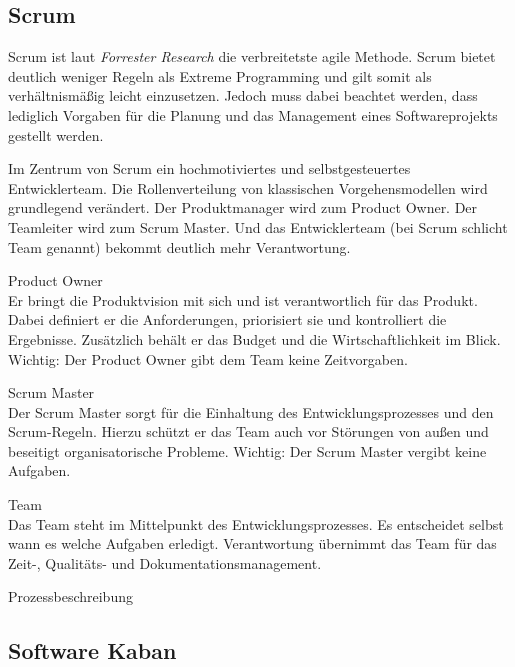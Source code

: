 \subsection{Scrum} \label{ch:scrum}
Scrum ist laut \emph{Forrester Research} die verbreitetste agile Methode. \cite{bib:ane} Scrum bietet deutlich weniger Regeln als Extreme Programming und gilt somit als verhältnismäßig leicht einzusetzen. Jedoch muss dabei beachtet werden, dass lediglich Vorgaben für die Planung und das Management eines Softwareprojekts gestellt werden. 

Im Zentrum von Scrum ein hochmotiviertes und selbstgesteuertes Entwicklerteam. Die Rollenverteilung von klassischen Vorgehensmodellen wird grundlegend verändert. Der Produktmanager wird zum Product Owner. Der Teamleiter wird zum Scrum Master. Und das Entwicklerteam (bei Scrum schlicht Team genannt) bekommt deutlich mehr Verantwortung.

\begin{description}
\item{Product Owner}\\
Er bringt die Produktvision mit sich und ist verantwortlich für das Produkt. Dabei definiert er die Anforderungen, priorisiert sie und kontrolliert die Ergebnisse. Zusätzlich behält er das Budget und die Wirtschaftlichkeit im Blick. Wichtig: Der Product Owner gibt dem Team keine Zeitvorgaben.

\item{Scrum Master}\\
Der Scrum Master sorgt für die Einhaltung des Entwicklungsprozesses und den Scrum-Regeln. Hierzu schützt er das Team auch vor Störungen von außen und beseitigt organisatorische Probleme. Wichtig: Der Scrum Master vergibt keine Aufgaben.

\item{Team}\\
Das Team steht im Mittelpunkt des Entwicklungsprozesses. Es entscheidet selbst wann es welche Aufgaben erledigt. Verantwortung übernimmt das Team für das Zeit-, Qualitäts- und Dokumentationsmanagement.
\end{description}

Prozessbeschreibung

\subsection{Software Kaban}


